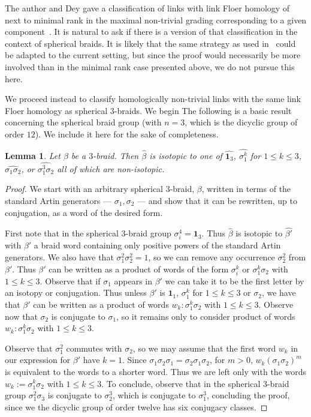 \documentclass{amsart}
\newtheorem{lemma}[theorem]{Lemma}
\theoremstyle{definition}
\theoremstyle{remark}
\numberwithin{equation}{section}
\begin{document}
The author and Dey gave a classification of links with link Floer homology of next to minimal rank in the maximal non-trivial grading corresponding to a given component~\cite[Theorem 5.1]{binns2024floer}. It is natural to ask if there is a version of that classification in the context of spherical braids. It is likely that the same strategy as used in~\cite{binns2024floer} could be adapted to the current setting, but since the proof would necessarily be more involved than in the minimal rank case presented above, we do not pursue this here.


We proceed instead to classify homologically non-trivial links with the same link Floer homology as spherical $3$-braids. We begin The following is a basic result concerning the spherical braid group (with $n=3$, which is the dicyclic group of order $12$). We include it here for the sake of completeness.

\begin{lemma}\label{lem:3braidss1s2}
    Let $\beta$ be a $3$-braid. Then $\widehat{\beta}$ is isotopic to one of $\widehat{\mathbf{1}_3}$, $\widehat{\sigma_1^k}$ for $1\leq k\leq 3$, $\widehat{\sigma_1\sigma_2}$, or $\widehat{\sigma_1^3\sigma_2}$ all of which are non-isotopic.
\end{lemma}
 

\begin{proof}
    We start with an arbitrary spherical $3$-braid, $\beta$, written in terms of the standard Artin generators --- $\sigma_1,\sigma_2$ --- and show that it can be rewritten, up to conjugation, as a word of the desired form.
    
    First note that in the spherical $3$-braid group $\sigma_i^4=\mathbf{1}_3$. Thus $\widehat{\beta}$ is isotopic to $\widehat{\beta'}$ with $\beta'$ a braid word containing only positive powers of the standard Artin generators. We also have that $\sigma_1^2\sigma_2^2=1$, so we can remove any occurrence $\sigma_2^2$ from $\beta'$. Thus $\beta'$ can be written as a product of words of the form $\sigma_i^k$ or $\sigma_1^k\sigma_2$ with $1\leq k\leq 3$. Observe that if $\sigma_1$ appears in $\beta'$ we can take it to be the first letter by an isotopy or conjugation. Thus unless $\beta'$ is $\mathbf{1}_1$, $\sigma_1^k$ for $1\leq k\leq 3$ or $\sigma_2$, we have that $\beta'$ can be written as a product of words $w_k:\sigma_1^k\sigma_2$ with $1\leq k\leq 3$. Observe now that $\sigma_2$ is conjugate to $\sigma_1$, so it remains only to consider product of words $w_k:\sigma_1^k\sigma_2$ with $1\leq k\leq 3$.

Observe that $\sigma_1^2$ commutes with $\sigma_2$, so we may assume that the first word $w_k$ in our expression for $\beta'$ have $k=1$. Since $\sigma_1\sigma_2\sigma_1=\sigma_2\sigma_1\sigma_2$, for $m>0$, $w_k(\sigma_1\sigma_2)^m$ is equivalent to the words to a shorter word. Thus we are left only with the words $w_k:=\sigma_1^k\sigma_2$ with $1\leq k\leq 3$. To conclude, observe that in the spherical $3$-braid group $\sigma_1^2\sigma_3$ is conjugate to $\sigma_2^3$, which is conjugate to $\sigma_1^3$, concluding the proof, since we the dicyclic group of order twelve has six conjugacy classes.\end{proof}
\end{document}
